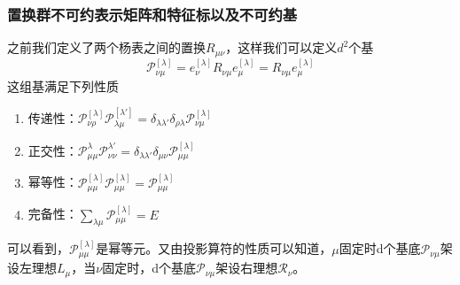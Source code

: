 \documentclass[12pt]{article}
\begin{document}
\subsubsection{置换群不可约表示矩阵和特征标以及不可约基}
之前我们定义了两个杨表之间的置换$R_{\mu\nu}$，这样我们可以定义$d^2$个基
\begin{equation*}
    \mathcal{P}^{[\lambda]}_{\nu\mu}=e_\nu^{[\lambda]} R_{\nu\mu}e_\mu^{[\lambda]}=R_{\nu\mu}e_\mu^{[\lambda]}
\end{equation*}
这组基满足下列性质
\begin{enumerate}
    \item 传递性：$\mathcal{P}_{\nu\rho}^{[\lambda]}\mathcal{P}_{\lambda\mu}^{[\lambda']}=\delta_{\lambda\lambda'}\delta_{\rho\lambda}\mathcal{P}_{\nu\mu}^{[\lambda]}$
    \item 正交性：$\mathcal{P}_{\mu\mu}^{\lambda}\mathcal{P}_{\nu\nu}^{\lambda'}=\delta_{\lambda\lambda'}\delta_{\mu\nu}\mathcal{P}_{\mu\mu}^{[\lambda]}$
    \item 幂等性：$\mathcal{P}_{\mu\mu}^{[\lambda]}\mathcal{P}_{\mu\mu}^{[\lambda]}=\mathcal{P}_{\mu\mu}^{[\lambda]}$
    \item 完备性：$\sum_{\lambda\mu}\mathcal{P}_{\mu\mu}^{[\lambda]}=E$
\end{enumerate}
可以看到，$\mathcal{P}_{\mu\mu}^{[\lambda]}$是幂等元。又由投影算符的性质可以知道，$\mu$固定时d个基底$\mathcal{P}_{\nu\mu}$架设左理想$\mathcal{}{L}_{\mu}$，当$\nu$固定时，d个基底$\mathcal{P}_{\nu\mu}$架设右理想$\mathcal{R}_{\nu}$。
\end{document}
